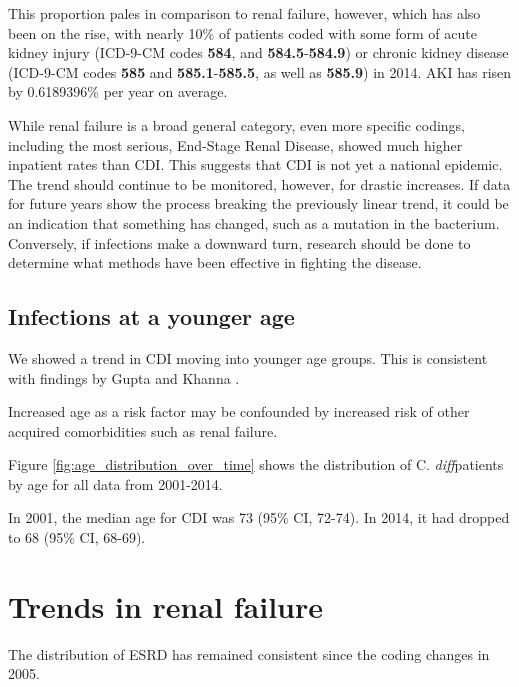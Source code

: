 \documentclass[12pt]{ociamthesis}\usepackage[]{graphicx}\usepackage[]{color}
\newcommand{\cdiff}{C. \textit{diff}}
\begin{document}
This proportion pales in comparison to renal failure, however, which has also been on the rise, with nearly 10\% of patients coded with
some form of acute kidney injury (ICD-9-CM codes \textbf{584}, and \textbf{584.5}-\textbf{584.9}) or chronic kidney disease 
(ICD-9-CM codes \textbf{585} and \textbf{585.1}-\textbf{585.5}, as well as \textbf{585.9}) in 2014. AKI has risen 
by 0.6189396\% per year on average.

While renal failure is a broad general category, even more specific codings, including the most serious, 
End-Stage Renal Disease, showed much higher inpatient rates than CDI. 
This suggests that CDI is not yet a national epidemic. The trend should continue to be
monitored, however, for drastic increases. If data for future years show the process breaking the previously linear trend, it could be an indication
that something has changed, such as a mutation in the bacterium. Conversely, if infections make a downward turn, research should be done
to determine what methods have been effective in fighting the disease.


\subsection{Infections at a younger age}
We showed a trend in CDI moving into younger age groups. This is consistent with findings by Gupta and Khanna \cite{Gupta2014}. 


Increased age as a risk factor may be confounded by increased risk of other acquired comorbidities such as renal failure. 
\cite{Krapohl2013, Masgala2014}


Figure \ref{fig:age_distribution_over_time} shows the distribution of \cdiff patients by age for all data from 2001-2014. 


In 2001, the median age for CDI was 73 (95\% CI, 72-74). In 2014, it had dropped to 68 (95\% CI, 68-69). 

\section{Trends in renal failure}


The distribution of ESRD has remained consistent since the coding changes in 2005. 
\label{fig:disease_trends_esrd}
\end{document}
